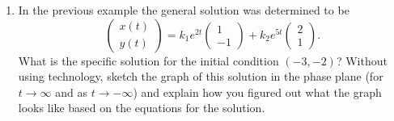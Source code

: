 \begin{enumerate}[resume]
\item	In the previous example the general solution was determined to be \label{12problem6}
\[
\begin{pmatrix}x(t)\\y(t)\end{pmatrix}=k_1e^{2t}\begin{pmatrix}1\\-1\end{pmatrix}+k_2e^{5t}\begin{pmatrix}2\\1\end{pmatrix}.
\]
What is the specific solution for the initial condition  $(-3, -2)$? Without using technology, sketch the graph of this solution in the phase plane (for $t\to\infty$  and as $t\to-\infty$) and explain how you figured out what the graph looks like based on the equations for the solution.
\end{enumerate}

\clearpage
 

